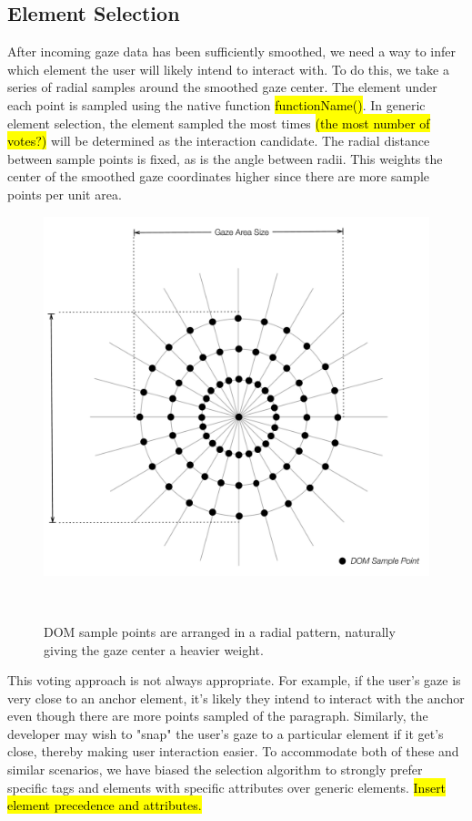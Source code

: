 \documentclass{sigchi}
\begin{document}
\subsection{Element Selection}
After incoming gaze data has been sufficiently smoothed, we need a way to infer which element the user will likely intend to interact with. To do this, we take a series of radial samples around the smoothed gaze center. The element under each point is sampled using the native function \hl{functionName()}. In generic element selection, the element sampled the most times \hl{(the most number of votes?)} will be determined as the interaction candidate. The radial distance between sample points is fixed, as is the angle between radii. This weights the center of the smoothed gaze coordinates higher since there are more sample points per unit area.

\begin{figure}
\centering
  \includegraphics[width=0.9\columnwidth]{figures/dom-sample-points.pdf}
  \caption{DOM sample points are arranged in a radial pattern, 
  naturally giving the gaze center a heavier weight.}~\label{fig:dom-sample-points}
\end{figure}

This voting approach is not always appropriate. For example, if the user's gaze is very close to an anchor element, it's likely they intend to interact with the anchor even though there are more points sampled of the paragraph. Similarly, the developer may wish to "snap" the user's gaze to a particular element if it get's close, thereby making user interaction easier. To accommodate both of these and similar scenarios, we have biased the selection algorithm to strongly prefer specific tags and elements with specific attributes over generic elements. \hl{Insert element precedence and attributes.}
\end{document}
